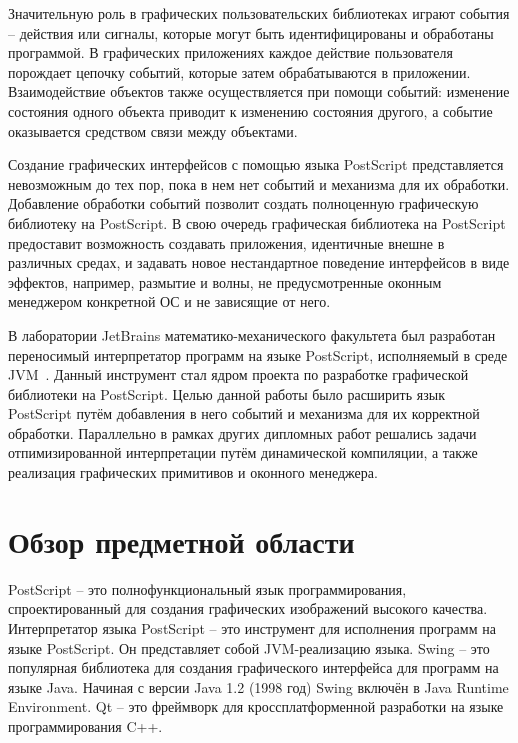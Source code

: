 Значительную роль в графических пользовательских библиотеках играют события --  действия или сигналы, которые могут быть идентифицированы и обработаны программой. В графических приложениях каждое действие пользователя порождает цепочку событий, которые затем обрабатываются в приложении. Взаимодействие объектов также осуществляется при помощи событий: изменение состояния одного объекта приводит к изменению состояния другого, а событие оказывается средством связи между объектами. 

Создание графических интерфейсов с помощью языка PostScript представляется невозможным до тех пор, пока в нем нет событий и механизма для их обработки. Добавление обработки событий позволит создать полноценную графическую библиотеку на PostScript. В свою очередь графическая библиотека на PostScript предоставит возможность создавать приложения, идентичные внешне в различных средах, и задавать новое нестандартное поведение интерфейсов в виде эффектов, например, размытие и волны, не предусмотренные оконным менеджером конкретной ОС и не зависящие от него.

В лаборатории JetBrains математико-механического факультета  был разработан переносимый интерпретатор программ на языке PostScript, исполняемый в среде JVM~\cite{wiki:makulov, wiki:pozdin, wiki:gudiev}. Данный инструмент стал ядром проекта по разработке графической библиотеки на  PostScript. Целью данной работы было расширить язык PostScript путём добавления в него событий и механизма для их корректной обработки. Параллельно в рамках других дипломных работ решались задачи отпимизированной интерпретации путём динамической компиляции, а также реализация графических примитивов и оконного менеджера.

 
\section{Обзор предметной области}

PostScript -- это полнофункциональный язык программирования, спроектированный для создания графических изображений высокого качества. %
Интерпретатор языка PostScript -- это инструмент для исполнения программ на языке PostScript. Он представляет собой JVM-реализацию языка. Swing -- это популярная библиотека для создания графического интерфейса для программ на языке Java. Начиная с версии Java 1.2 (1998 год) Swing включён в Java Runtime Environment. Qt -- это фреймворк для кроссплатформенной разработки на языке программирования C++. 

